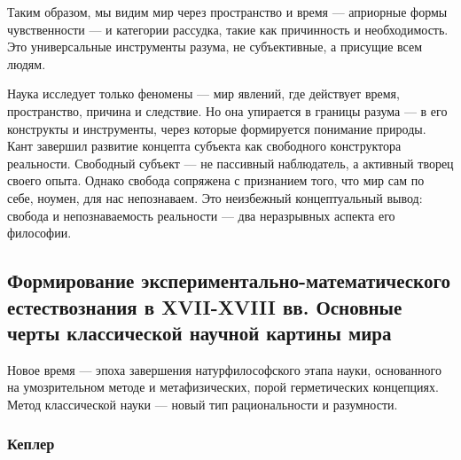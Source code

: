 Таким образом, мы видим мир через пространство и время --- априорные формы чувственности --- и категории рассудка, такие как причинность и необходимость. Это универсальные инструменты разума, не субъективные, а присущие всем людям.

Наука исследует только феномены --- мир явлений, где действует время, пространство, причина и следствие. Но она упирается в границы разума --- в его конструкты и инструменты, через которые формируется понимание природы.
Кант завершил развитие концепта субъекта как свободного конструктора реальности. Свободный субъект --- не пассивный наблюдатель, а активный творец своего опыта. Однако свобода сопряжена с признанием того, что мир сам по себе, ноумен, для нас непознаваем. Это неизбежный концептуальный вывод: свобода и непознаваемость реальности --- два неразрывных аспекта его философии.

\subsection{Формирование экспериментально-математического естествознания в XVII-XVIII вв.
Основные черты классической научной картины мира} 




Новое время --- эпоха завершения натурфилософского этапа науки, основанного на умозрительном методе и метафизических, порой герметических концепциях.
Метод классической науки --- новый тип рациональности и разумности.

\subsubsection{Кеплер} 

